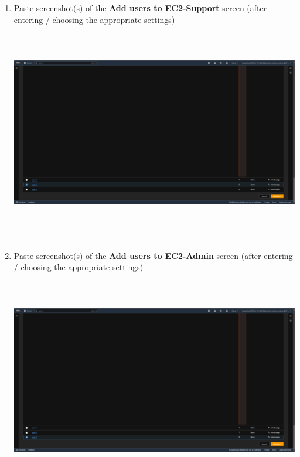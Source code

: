 \documentclass[11pt]{article}
\begin{document}
\begin{enumerate}[resume]
    \vspace{65mm}

    \item Paste screenshot$($s$)$ of the \textbf{Add users to EC2-Support} screen (after entering / choosing the appropriate settings) \\
    
    
    {\centering
    \includegraphics[width=6.1in, height=3.8in]{pics/5.png}
    }

    \vspace{5mm}
    
    \item Paste screenshot$($s$)$ of the \textbf{Add users to EC2-Admin} screen (after entering / choosing the appropriate settings) \\


    {\centering
    \includegraphics[width=6.1in, height=3.8in]{pics/6.png}
    }


\end{enumerate}
\end{document}

